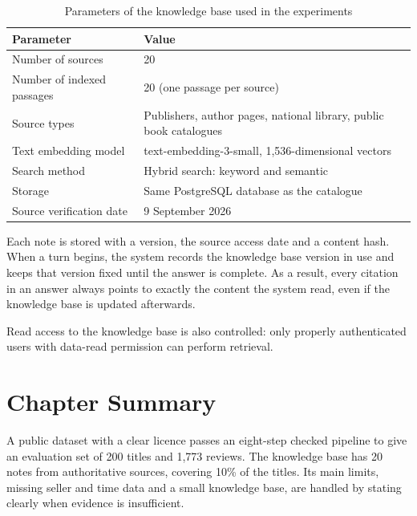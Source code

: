 \begin{table}[!htbp]
\caption{Parameters of the knowledge base used in the experiments}
\label{tab:kho-tri-thuc}
\cobang
\begin{tabularx}{\linewidth}{P{5.4cm}Y}
\toprule
\textbf{Parameter} & \textbf{Value}\\
\midrule
Number of sources & 20\\
Number of indexed passages & 20 (one passage per source)\\
Source types & Publishers, author pages, national library, public book catalogues\\
Text embedding model & text-embedding-3-small, 1,536-dimensional vectors\\
Search method & Hybrid search: keyword and semantic\\
Storage & Same PostgreSQL database as the catalogue\\
Source verification date & 9 September 2026\\
\bottomrule
\end{tabularx}
\end{table}

Each note is stored with a version, the source access date and a content hash. When a turn begins, the system records the knowledge base version in use and keeps that version fixed until the answer is complete. As a result, every citation in an answer always points to exactly the content the system read, even if the knowledge base is updated afterwards.

Read access to the knowledge base is also controlled: only properly authenticated users with data-read permission can perform retrieval.

\section{Chapter Summary}

A public dataset with a clear licence passes an eight-step checked pipeline to give an evaluation set of 200 titles and 1,773 reviews. The knowledge base has 20 notes from authoritative sources, covering 10\% of the titles. Its main limits, missing seller and time data and a small knowledge base, are handled by stating clearly when evidence is insufficient.
